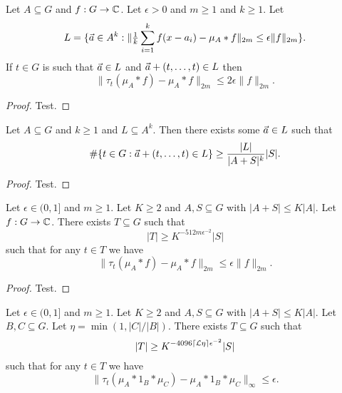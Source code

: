 \begin{lemma}
\label{aps_in_translates}
\leanok
Let $A\subseteq G$ and $f:G\to \mathbb{C}$. Let $\epsilon>0$ and $m\geq 1$ and $k\geq 1$. Let
\[L=\{ {\vec{a}}\in A^k : \|\tfrac{1}{k}\sum_{i=1}^kf(x-a_i)-\mu_A\ast f\|_{2m}\leq \epsilon \| f\|_{2m}\}.\]
If $t\in G$ is such that ${\vec{a}}\in L$ and ${\vec{a}}+(t,\ldots,t)\in L$ then
\[\| \tau_t(\mu_A\ast f)-\mu_A\ast f\|_{2m}\leq 2\epsilon \|f\|_{2m}.\]
\end{lemma}

\begin{proof}
\leanok
Test.
\end{proof}


\begin{lemma}
\label{lots_of_diagonals}
\leanok
Let $A\subseteq G$ and $k\geq 1$ and $L\subseteq A^k$. Then there exists some ${\vec{a}}\in L$ such that
\[\#\{ t\in G : {\vec{a}}+(t,\ldots,t)\in L\}\geq \frac{\lvert L\rvert}{\lvert A+S\rvert^k}\lvert S\rvert.\]
\end{lemma}

\begin{proof}
\leanok
Test.
\end{proof}


\begin{theorem}
\label{lp_ap}
\leanok
Let $\epsilon\in (0,1]$ and $m\geq 1$. Let $K\geq 2$ and $A,S\subseteq G$ with $\lvert A+S\rvert\leq K\lvert A\rvert$.
Let $f:G\to \mathbb{C}$. There exists $T\subseteq G$ such that
\[\lvert T\rvert \geq K^{-512m\epsilon^{-2}}\lvert S\rvert\]
such that for any $t\in T$ we have
\[\| \tau_t(\mu_A\ast f)-\mu_A\ast f\|_{2m}\leq \epsilon \| f\|_{2m}.\]
\end{theorem}

\begin{proof}
\leanok
Test.
\end{proof}


\begin{theorem}
\label{linfty_ap}
Let $\epsilon\in (0,1]$ and $m\geq 1$. Let $K\geq 2$ and $A,S\subseteq G$ with $\lvert A+S\rvert\leq K\lvert A\rvert$.
Let $B,C\subseteq G$. Let $\eta=\min(1,\lvert C\rvert/\lvert B\rvert)$. There exists $T\subseteq G$ such that
\[\lvert T\rvert \geq K^{-4096\lceil \mathcal{L}{\eta}\rceil\epsilon^{-2}}\lvert S\rvert\]
such that for any $t\in T$ we have
\[\| \tau_t(\mu_A\ast 1_B\ast \mu_C)-\mu_A\ast 1_B\ast \mu_C\|_{\infty}\leq \epsilon.\]
\end{theorem}

